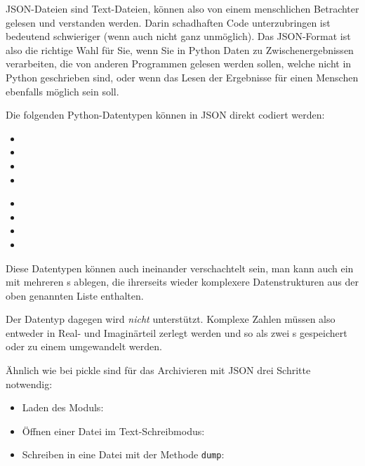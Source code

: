 JSON-Dateien sind Text-Dateien, können also von einem menschlichen Betrachter gelesen und verstanden werden. Darin schadhaften Code unterzubringen ist bedeutend schwieriger (wenn auch nicht ganz unmöglich). Das JSON-Format ist also die richtige Wahl für Sie, wenn Sie in Python Daten zu Zwischenergebnissen verarbeiten, die von anderen Programmen gelesen werden sollen, welche nicht in Python geschrieben sind, oder wenn das Lesen der Ergebnisse für einen Menschen ebenfalls möglich sein soll.

Die folgenden Python-Datentypen können in JSON direkt codiert werden:

\begin{minipage}{.49\linewidth}
\begin{itemize}
\item {}
\item {}
\item {}
\item {}
\end{itemize}
\end{minipage}
\begin{minipage}{.49\linewidth}
\begin{itemize}
\item {}
\item {}
\item {}
\item {}
\end{itemize}
\end{minipage}

Diese Datentypen können auch ineinander verschachtelt sein, \ie man kann auch ein  mit mehreren s ablegen, die ihrerseits wieder komplexere Datenstrukturen aus der oben genannten Liste enthalten.

Der Datentyp  dagegen wird \emph{nicht} unterstützt. Komplexe Zahlen müssen also entweder in Real- und Imaginärteil zerlegt werden und so als zwei s gespeichert oder zu einem  umgewandelt werden.

Ähnlich wie bei pickle sind für das Archivieren mit JSON drei Schritte notwendig: 
\begin{itemize}
\item Laden des Moduls: 
\item Öffnen einer Datei im Text-Schreibmodus: 
\item Schreiben in eine Datei mit der Methode \texttt{dump}: 
\end{itemize}


